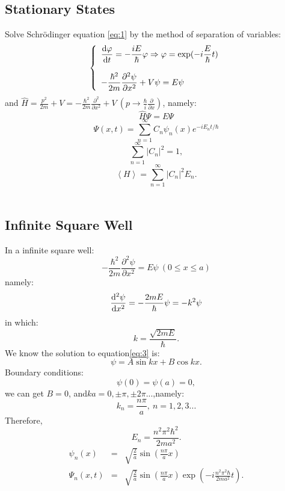 \documentclass[12pt, 
]{article}
\begin{document}
	\subsection{Stationary States}
	Solve Schr\"odinger equation \eqref{eq:1} by the method of separation of variables:
		\[
		\left\{
			\begin{array}{l}
				\displaystyle\frac{{\rm d}\varphi}{{\rm d}t}=-\frac{iE}{\hbar}\varphi\Rightarrow\varphi=\exp(-i\frac{E}{\hbar}t)\\	
				~\\
				\displaystyle-\frac{\hbar^2}{2m}\frac{\partial^2\psi}{\partial x^2}+V\psi=E\psi
			\end{array}
		\right.
		\]	
	and $\displaystyle\hat{H}=\frac{p^2}{2m}+V=-\frac{\hbar^2}{2m}\frac{\partial^2}{\partial x^2}+V~(p\rightarrow\frac{\hbar}{i}\frac{\partial}{\partial x})$, namely:
	\begin{equation}\label{eq:2}
		\hat{H}\varPsi=E\varPsi			
	\end{equation}
	\[
		\varPsi(x,t)=\sum^{\infty}_{n=1}C_n \psi_n(x)e^{-iE_n t/\hbar}
	\]
	\begin{equation}
		\sum_{n=1}^{\infty}\left |C_n\right|^2 =1,
	\end{equation}
	\begin{equation}
		\left<H\right>=\sum_{n=1}^\infty\left|C_n\right|^2E_n.
	\end{equation}
	~\\

	\subsection{Infinite Square Well}
	In a infinite square well:
	\[
		-\frac{\hbar^2}{2m}\frac{\partial^2\psi}{\partial x^2}=E\psi~(0\leqslant x \leqslant a)
	\]
	namely:
	\begin{equation}\label{eq:3}
		\frac{\rm{d^2}\psi}{{\rm d}x^2}=-\frac{2mE}{\hbar}\psi=-k^2\psi 
	\end{equation}
	in which:
	\[
		k=\frac{\sqrt{2mE}}{\hbar}			
	.\]
	We know the solution to equation\eqref{eq:3} is:
	\begin{equation}
		\psi=A\sin kx+B\cos kx.
	\end{equation}
	Boundary conditions:$$\psi(0)=\psi(a)=0,$$we can get $B=0$, and$ka=0,\pm\pi, \pm2\pi...$,namely:
	\[
		k_n=\frac{n\pi}{a},~n=1,2,3...
	\]
	Therefore,$$E_n=\frac{n^2\pi^2\hbar^2}{2ma^2}.$$
	\begin{eqnarray}
		\psi_n(x)&=&\sqrt{\frac{2}{a}}\sin\left (\frac{n\pi}{a}x\right)\\
		\varPsi_n(x,t)&=&\sqrt{\frac{2}{a}}\sin \left (\frac{n\pi}{a}x\right)\exp \left (-i\frac{n^2\pi^2\hbar}{2ma^2}t\right).
	\end{eqnarray}
	~\\
\end{document}
